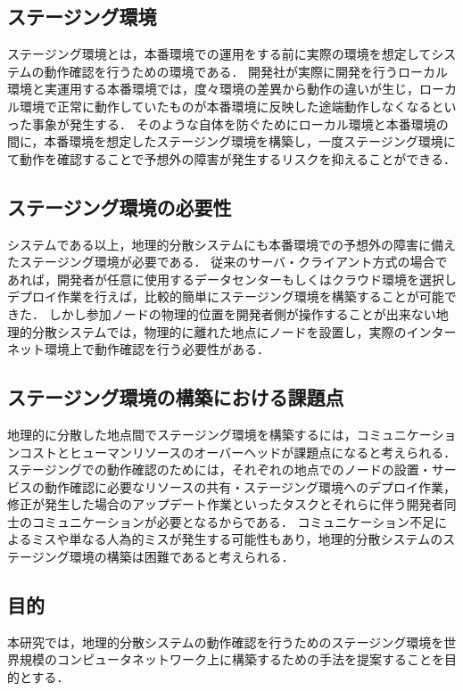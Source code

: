 \subsection{ステージング環境}
ステージング環境とは，本番環境での運用をする前に実際の環境を想定してシステムの動作確認を行うための環境である．
開発社が実際に開発を行うローカル環境と実運用する本番環境では，度々環境の差異から動作の違いが生じ，ローカル環境で正常に動作していたものが本番環境に反映した途端動作しなくなるといった事象が発生する．
そのような自体を防ぐためにローカル環境と本番環境の間に，本番環境を想定したステージング環境を構築し，一度ステージング環境にて動作を確認することで予想外の障害が発生するリスクを抑えることができる．

\subsection{ステージング環境の必要性}
システムである以上，地理的分散システムにも本番環境での予想外の障害に備えたステージング環境が必要である．
従来のサーバ・クライアント方式の場合であれば，開発者が任意に使用するデータセンターもしくはクラウド環境を選択しデプロイ作業を行えば，比較的簡単にステージング環境を構築することが可能できた．
しかし参加ノードの物理的位置を開発者側が操作することが出来ない地理的分散システムでは，物理的に離れた地点にノードを設置し，実際のインターネット環境上で動作確認を行う必要性がある．

\subsection{ステージング環境の構築における課題点}
地理的に分散した地点間でステージング環境を構築するには，コミュニケーションコストとヒューマンリソースのオーバーヘッドが課題点になると考えられる．
ステージングでの動作確認のためには，それぞれの地点でのノードの設置・サービスの動作確認に必要なリソースの共有・ステージング環境へのデプロイ作業，修正が発生した場合のアップデート作業といったタスクとそれらに伴う開発者同士のコミュニケーションが必要となるからである．
コミュニケーション不足によるミスや単なる人為的ミスが発生する可能性もあり，地理的分散システムのステージング環境の構築は困難であると考えられる．

\subsection{目的}
本研究では，地理的分散システムの動作確認を行うためのステージング環境を世界規模のコンピュータネットワーク上に構築するための手法を提案することを目的とする．


